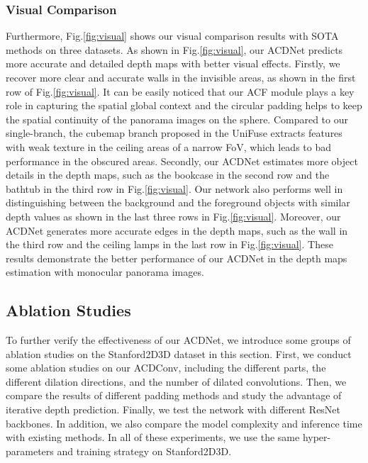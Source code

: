 \documentclass[letterpaper]{article} \usepackage{aaai21}  \usepackage{times}  \usepackage{helvet} \usepackage{courier}  \usepackage[hyphens]{url}  \usepackage{graphicx} \urlstyle{rm} \def\UrlFont{\rm}  \usepackage{natbib}  \usepackage{caption} \frenchspacing  \setlength{\pdfpagewidth}{8.5in}  \setlength{\pdfpageheight}{11in}
\newcommand{\newchange}[1]{{\color{black}#1}}
\begin{document}
\subsubsection{Visual Comparison}
Furthermore, Fig.\ref{fig:visual} shows our visual comparison results with SOTA methods on three datasets.
As shown in Fig.\ref{fig:visual}, our ACDNet predicts more accurate and detailed depth maps with better visual effects. Firstly, we recover more clear and accurate walls in the invisible areas, as shown in the first row of Fig.\ref{fig:visual}. It can be easily noticed that our ACF module plays a key role in capturing the spatial global context and the circular padding helps to keep the spatial continuity of the panorama images on the sphere.
Compared to our single-branch, the cubemap branch proposed in the UniFuse extracts features with weak texture in the ceiling areas of a narrow FoV, which leads to bad performance in the obscured areas. Secondly, our ACDNet estimates more object details in the depth maps, such as the bookcase in the second row and the bathtub in the third row in Fig.\ref{fig:visual}. Our network also performs well in distinguishing between the background and the foreground objects with similar depth values as shown in the last three rows in Fig.\ref{fig:visual}. Moreover, our ACDNet generates more accurate edges in the depth maps, such as the wall in the third row and the ceiling lamps in the last row in Fig.\ref{fig:visual}. These results demonstrate the better performance of our ACDNet in the depth maps estimation with monocular panorama images.

\subsection{Ablation Studies}

To further verify the effectiveness of our ACDNet, we introduce some groups of ablation studies on the Stanford2D3D dataset in this section. First, we conduct some ablation studies on our ACDConv, including the different parts, the different dilation directions, and the number of dilated convolutions. 
\newchange{
Then, we compare the results of different padding methods and study the advantage of iterative depth prediction.
Finally, we test the network with different ResNet backbones. In addition, we also compare the model complexity and inference time with existing methods. In all of these experiments, we use the same hyper-parameters and training strategy on Stanford2D3D.
}
\end{document}
